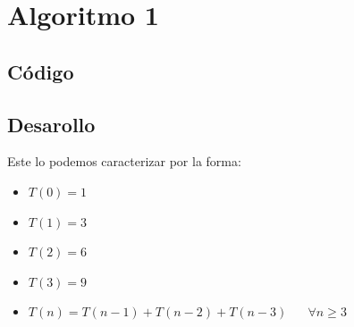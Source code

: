 \documentclass[12pt, fleqn]{article}                            %
\DeclareMathOperator \Space {\quad}                             %
\theoremstyle{break}                                            %
\begin{document}
\restoregeometry                                                    %
\nopagecolor                                                        %


\tableofcontents{}
\label{sec:Index}

\clearpage



\clearpage
\section{Algoritmo 1}


    \subsection{Código}

        


    \vspace{1em}
    \subsection{Desarollo}

        Este lo podemos caracterizar por la forma:
        \begin{itemize}
            \item $T(0) = 1$
            \item $T(1) = 3$
            \item $T(2) = 6$
            \item $T(3) = 9$
            \item $T(n) = T(n - 1) + T(n - 2) + T(n -  3) \Space \forall n \geq 3$
        \end{itemize}
\end{document}
